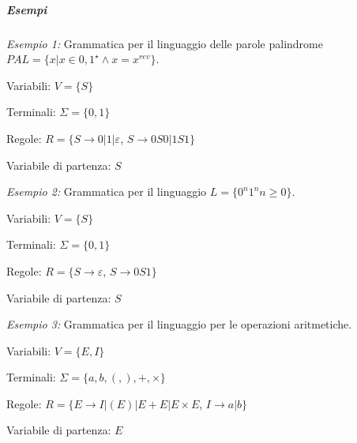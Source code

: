 \subparagraph{Esempi}
\begin{description}
	\item \emph{Esempio 1:} Grammatica per il linguaggio delle parole palindrome $PAL = \{x|x \in {0,1}^{\star} \land x=x^{rev}\}$.
		\begin{description}
			\item Variabili: $V = \{S\}$
			\item Terminali: $\Sigma = \{0, 1\}$
			\item Regole: $R = \{ S \to 0 | 1 | \varepsilon$, $S \to 0S0 | 1S1 \}$
			\item Variabile di partenza: $S$
		\end{description}
	\item \emph{Esempio 2:} Grammatica per il linguaggio $L=\{0^n1^n n \geq 0\}$.
		\begin{description}
			\item Variabili: $V = \{S\}$
			\item Terminali: $\Sigma = \{0, 1\}$
			\item Regole: $R = \{ S \to \varepsilon$, $S \to 0S1 \}$
			\item Variabile di partenza: $S$
		\end{description}
	\item \emph{Esempio 3:} Grammatica per il linguaggio per le operazioni aritmetiche.
		\begin{description}
			\item Variabili: $V = \{E, I\}$
			\item Terminali: $\Sigma = \{a, b, (, ), +, \times\}$
			\item Regole: $R = \{ E \to I | (E) | E+E | E \times E$, $I \to a | b \}$
			\item Variabile di partenza: $E$
		\end{description}
\end{description}
